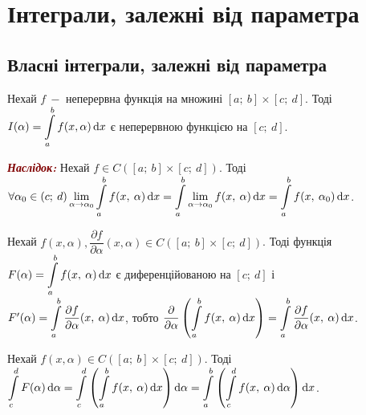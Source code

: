 \section{\Large{Інтеграли, залежні від параметра}}
\subsection{\large{Власні інтеграли, залежні від параметра}}


\begin{theorem} 
Нехай  $f \:  -$ неперервна функція на множині $ [a; \: b] \times [c; \:d]$. Тоді $I(\alpha) = \displaystyle\int\limits_a^b f(x,\alpha) \, \mathrm{d}x $ є неперервною функцією на $[c; \:d]$.
\end{theorem} 
\textcolor{Maroon}{\textbf{\textit{Наслідок:}}} Нехай  $f \in C([a; \: b] \times [c; \:d])$. Тоді $\forall \alpha_0 \in (c; \:d) \displaystyle\lim\limits_{\alpha \to \alpha_0} \displaystyle\int\limits_a^b f(x, \: \alpha) \, \mathrm{d}x =\displaystyle\int\limits_a^b \displaystyle\lim\limits_{\alpha \to \alpha_0}  f(x, \: \alpha) \, \mathrm{d}x = \displaystyle\int\limits_a^b f(x, \: \alpha_0) \, \mathrm{d}x$.

\begin{theorem} 


\end{theorem} 

Нехай $f(x, \alpha), \dfrac{\partial f}{\partial \alpha} (x, \alpha) \in C([a; \: b] \times [c; \: d])$. Тоді функція $F(\alpha) = \displaystyle\int\limits_a^b f(x, \: \alpha) \, \mathrm{d}x $ є диференційованою на $[c; \:d]  $ і\\ $F'(\alpha) = \displaystyle\int\limits_a^b  \dfrac{\partial f}{\partial \alpha} (x, \: \alpha) \, \mathrm{d}x $, тобто $\dfrac{\partial}{\partial \alpha}\left( \displaystyle\int\limits_a^b f(x, \: \alpha) \, \mathrm{d}x \right)=  \displaystyle\int\limits_a^b  \dfrac{\partial f}{\partial \alpha} (x, \: \alpha) \, \mathrm{d}x$.

\begin{theorem} 

\end{theorem} 
Нехай $f(x, \alpha) \in C([a; \: b] \times [c; \:d])$.
Тоді $\displaystyle\int\limits_c^d F(\alpha) \, \mathrm{d}\alpha= \displaystyle\int\limits_c^d \left(\displaystyle\int\limits_a^b f(x, \: \alpha) \, \mathrm{d}x \right) \mathrm{d}\alpha = \displaystyle\int\limits_a^b \left(\displaystyle\int\limits_c^d f(x, \: \alpha) \, \mathrm{d}\alpha \right) \mathrm{d}x $.

